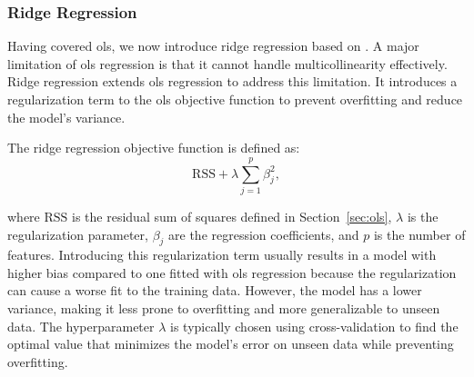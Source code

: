 \subsubsection{Ridge Regression}
Having covered \gls{ols}, we now introduce ridge regression based on \citet{James2023AnIS}.
A major limitation of \gls{ols} regression is that it cannot handle multicollinearity effectively.
Ridge regression extends \gls{ols} regression to address this limitation.
It introduces a regularization term to the \gls{ols} objective function to prevent overfitting and reduce the model's variance.

The ridge regression objective function is defined as:
$$
\text{RSS} + \lambda \sum_{j=1}^{p} \beta_j^2,
$$

where $\text{RSS}$ is the residual sum of squares defined in Section~\ref{sec:ols}, $\lambda$ is the regularization parameter, $\beta_j$ are the regression coefficients, and $p$ is the number of features.
Introducing this regularization term usually results in a model with higher bias compared to one fitted with \gls{ols} regression because the regularization can cause a worse fit to the training data.
However, the model has a lower variance, making it less prone to overfitting and more generalizable to unseen data.
The hyperparameter $\lambda$ is typically chosen using cross-validation to find the optimal value that minimizes the model's error on unseen data while preventing overfitting.